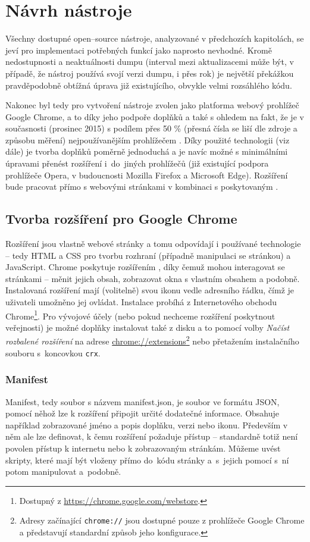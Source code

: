  
 
\chapter{Návrh nástroje}
Všechny dostupné open--source nástroje, analyzované v předchozích kapitolách, se jeví pro implementaci potřebných funkcí jako naprosto nevhodné. Kromě nedostupnosti a neaktuálnosti dumpu (interval mezi aktualizacemi může být, v případě, že nástroj používá svojí verzi dumpu, i přes rok) je největší překážkou pravděpodobně obtížná úprava již existujícího, obvykle velmi rozsáhlého kódu.

Nakonec byl tedy pro vytvoření nástroje zvolen jako platforma webový prohlížeč Google Chrome, a to díky jeho podpoře doplňků a také s ohledem na fakt, že je v současnosti (prosinec 2015) s podílem přes 50 \% (přesná čísla se liší dle zdroje a způsobu měření) nejpoužívanějším prohlížečem \cite{w3chrome} \cite{gschrome}. Díky použité technologii (viz dále) je tvorba doplňků poměrně jednoduchá a je navíc možné s minimálními úpravami přenést rozšíření i~do~jiných prohlížečů (již existující podpora prohlížeče Opera, v budoucnosti Mozilla Firefox a Microsoft Edge). Rozšíření bude pracovat přímo s webovými stránkami v kombinaci s poskytovaným .

\section{Tvorba rozšíření pro Google Chrome}
\label{label:makingof}
Rozšíření jsou vlastně webové stránky a tomu odpovídají i používané technologie -- tedy HTML a CSS pro tvorbu rozhraní (případně manipulaci se stránkou) a JavaScript. Chrome poskytuje rozšířením , díky čemuž mohou interagovat se stránkami -- měnit jejich obsah, zobrazovat okna s vlastním obsahem a podobně. Instalovaná rozšíření mají (volitelně) svou ikonu vedle adresního řádku, čímž je uživateli umožněno jej ovládat. Instalace probíhá z Internetového obchodu Chrome\footnote{Dostupný z \url{https://chrome.google.com/webstore}.}. Pro vývojové účely (nebo pokud nechceme rozšíření poskytnout veřejnosti) je možné doplňky instalovat také z disku a to pomocí volby \textit{Načíst rozbalené rozšíření} na adrese \url{chrome://extensions}\footnote{Adresy začínající \texttt{chrome://} jsou dostupné pouze z prohlížeče Google Chrome a představují standardní způsob jeho konfigurace.} nebo přetažením instalačního souboru s~koncovkou \texttt{crx}.
\subsection{Manifest}
\label{label:manifest}
Manifest, tedy soubor s názvem manifest.json, je soubor ve formátu JSON, pomocí něhož lze k rozšíření připojit určité dodatečné informace. Obsahuje například zobrazované jméno a popis doplňku, verzi nebo ikonu. Především v něm ale lze definovat, k čemu rozšíření požaduje přístup -- standardně totiž není povolen přístup k internetu nebo k zobrazovaným stránkám. Můžeme uvést skripty, které mají být vloženy přímo do~kódu stránky a~s~jejich pomocí s~ní potom manipulovat a~podobně.
